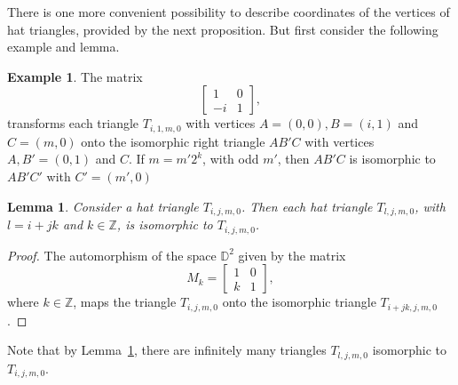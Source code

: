 \documentclass[12pt]{amsart}
\def\mbZ{\mathbb{Z}}
\def\mbD{\mathbb{D}}
\theoremstyle{plain}
\newtheorem{lemma}[theorem]{Lemma}
\theoremstyle{definition}
\newtheorem{example}[theorem]{Example}
\numberwithin{equation}{section}
\begin{document}
There is one more convenient possibility to describe coordinates of the vertices of hat
triangles, provided by the next proposition.
But first consider the following example and lemma.



\begin{example}\label{Ex:i1m}
The matrix
\begin{equation}
\begin{bmatrix}
1 & 0 \\
-i & 1
\end{bmatrix}
,
\end{equation}
transforms each triangle $T_{i,1,m,0}$ with vertices $A = (0,0), B = (i,1)$ and $C =
(m,0)$ onto the isomorphic right triangle $AB'C$ with vertices $A, B'= (0,1)$ and $C$.
If $m = m'2^k$, with odd $m'$, then $AB'C$ is isomorphic to $AB'C'$ with $C' = (m',0)$
\end{example}



\begin{lemma}\label{L:infisoms}
Consider a hat triangle $T_{i,j,m,0}$. Then each hat triangle $T_{l,j,m,0}$,  with $l = i + jk$ and $k \in \mbZ$, is isomorphic to $T_{i,j,m,0}$.
\end{lemma}
\begin{proof}
The automorphism of the space $\mbD^2$ given by the matrix
\begin{equation}\label{E:Mk}
M_k =
\begin{bmatrix}
1 & 0 \\
k & 1
\end{bmatrix},
\end{equation}
where $k \in \mbZ$,
maps the triangle $T_{i,j,m,0}$ onto the isomorphic triangle $T_{i+jk,j,m,0}$.
\end{proof}
Note that by Lemma~\ref{L:infisoms}, there are infinitely many triangles $T_{l,j,m,0}$
isomorphic to $T_{i,j,m,0}$.
\end{document}
